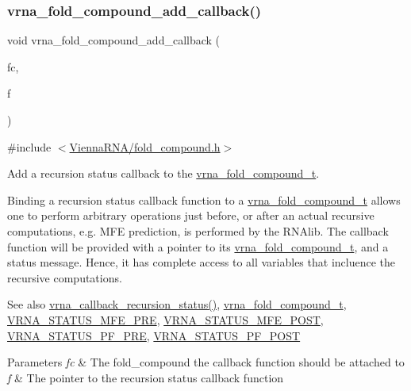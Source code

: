 \subsubsection{\texorpdfstring{vrna\_fold\_compound\_add\_callback()}{vrna\_fold\_compound\_add\_callback()}}
{\footnotesize\ttfamily void vrna\+\_\+fold\+\_\+compound\+\_\+add\+\_\+callback (\begin{DoxyParamCaption}\item[{\mbox{\hyperlink{group__fold__compound_ga1b0cef17fd40466cef5968eaeeff6166}{vrna\+\_\+fold\+\_\+compound\+\_\+t}} $\ast$}]{fc,  }\item[{\mbox{\hyperlink{group__fold__compound_gac86036fa8cad1108832335063243cdc8}{vrna\+\_\+callback\+\_\+recursion\+\_\+status}} $\ast$}]{f }\end{DoxyParamCaption})}



{\ttfamily \#include $<$\mbox{\hyperlink{fold__compound_8h}{Vienna\+R\+N\+A/fold\+\_\+compound.\+h}}$>$}



Add a recursion status callback to the \mbox{\hyperlink{group__fold__compound_ga1b0cef17fd40466cef5968eaeeff6166}{vrna\+\_\+fold\+\_\+compound\+\_\+t}}. 

Binding a recursion status callback function to a \mbox{\hyperlink{group__fold__compound_ga1b0cef17fd40466cef5968eaeeff6166}{vrna\+\_\+fold\+\_\+compound\+\_\+t}} allows one to perform arbitrary operations just before, or after an actual recursive computations, e.\+g. M\+FE prediction, is performed by the R\+N\+Alib. The callback function will be provided with a pointer to its \mbox{\hyperlink{group__fold__compound_ga1b0cef17fd40466cef5968eaeeff6166}{vrna\+\_\+fold\+\_\+compound\+\_\+t}}, and a status message. Hence, it has complete access to all variables that incluence the recursive computations.

\begin{DoxySeeAlso}{See also}
\mbox{\hyperlink{group__fold__compound_gac86036fa8cad1108832335063243cdc8}{vrna\+\_\+callback\+\_\+recursion\+\_\+status()}}, \mbox{\hyperlink{group__fold__compound_ga1b0cef17fd40466cef5968eaeeff6166}{vrna\+\_\+fold\+\_\+compound\+\_\+t}}, \mbox{\hyperlink{group__fold__compound_ga1a5053dc8acbb0111e852988726f07d6}{V\+R\+N\+A\+\_\+\+S\+T\+A\+T\+U\+S\+\_\+\+M\+F\+E\+\_\+\+P\+RE}}, \mbox{\hyperlink{group__fold__compound_ga47c900ca76e56e59e2e83a06e0bde641}{V\+R\+N\+A\+\_\+\+S\+T\+A\+T\+U\+S\+\_\+\+M\+F\+E\+\_\+\+P\+O\+ST}}, \mbox{\hyperlink{group__fold__compound_ga91795d35ebdb6f32be50459f24b3d114}{V\+R\+N\+A\+\_\+\+S\+T\+A\+T\+U\+S\+\_\+\+P\+F\+\_\+\+P\+RE}}, \mbox{\hyperlink{group__fold__compound_ga1c6fa243533fd026e50f7d595eaaa565}{V\+R\+N\+A\+\_\+\+S\+T\+A\+T\+U\+S\+\_\+\+P\+F\+\_\+\+P\+O\+ST}}
\end{DoxySeeAlso}

\begin{DoxyParams}{Parameters}
{\em fc} & The fold\+\_\+compound the callback function should be attached to \\
\hline
{\em f} & The pointer to the recursion status callback function \\
\hline
\end{DoxyParams}
